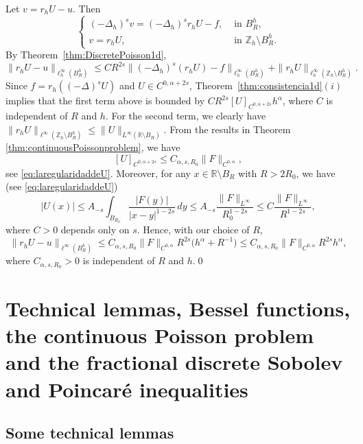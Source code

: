 \documentclass[a4paper,11pt,reqno]{amsart}
\newcommand{\R}{\mathbb{R}}
\newcommand{\Z}{\mathbb{Z}}
\theoremstyle{definition}
\numberwithin{equation}{section}
\begin{document}
Let $v=r_hU-u$. Then
\begin{equation*}
\begin{cases}
(-\Delta_h)^sv=(-\Delta_h)^sr_hU-f, & \text{ in } B_R^h, \\
v=r_hU, & \text{ in } \Z_h\setminus B_R^h.
\end{cases}
\end{equation*}
By Theorem~\ref{thm:DiscretePoisson1d},
\[
\|r_hU-u\|_{\ell_h^\infty(B_R^h)}\le CR^{2s}\|(-\Delta_h)^{s}(r_hU)-f
\|_{\ell^\infty_h(B_R^h)} + \|r_hU\|_{\ell^\infty_h(\Z_h\setminus B_R^h)}.
\]
Since $f=r_h((-\Delta)^sU)$ and $U\in C^{0,\alpha+2s}$,
Theorem~\ref{thm:consistencia1d}$(i)$ implies that the first term above
is bounded by $CR^{2s}[U]_{C^{0,\alpha+2s}}h^{\alpha}$,
where $C$ is independent of $R$ and $h$.
For the second term, we clearly have
$\|r_hU\|_{\ell^\infty(\Z_h\setminus B_R^h)}\le \|U\|_{L^\infty(\R\setminus B_R)}$.
From the results in Theorem \ref{thm:continuousPoissonproblem}, we have
$$
[U]_{C^{0,\alpha+2s}}\leq C_{\alpha,s,R_0}\|F\|_{C^{0,\alpha}},
$$
see \eqref{eq:laregularidaddeU}.
Moreover, for any $x\in \R\setminus B_R$ with $R>2R_0$, we have (see \eqref{eq:laregularidaddeU})
\begin{equation}
\label{laestimaciondeloqueresta}
|U(x)|\le A_{-s}\int_{B_{R_0}}\frac{|F(y)|}{|x-y|^{1-2s}}\,dy
\le A_{-s}\frac{\|F\|_{L^\infty}}{R_0^{1-2s}}\le C\frac{\|F\|_{L^\infty}}{R^{1-2s}},
\end{equation}
where $C>0$ depends only on $s$.
Hence, with our choice of $R$,
\[
\|r_hU-u\|_{\ell^\infty(B_R^h)}
\le C_{\alpha,s,R_0}\|F\|_{C^{0,\alpha}}R^{2s}\big(h^{\alpha}+R^{-1}\big)
\leq C_{\alpha,s,R_0}\|F\|_{C^{0,\alpha}}R^{2s}h^{\alpha},
\]
where $C_{\alpha,s,R_0}>0$ is independent of $R$ and $h$.\qed

\section{Technical lemmas, Bessel functions, the continuous Poisson problem
and the fractional discrete Sobolev and Poincar\'e inequalities}
\label{sec:technical}

\subsection{Some technical lemmas}
\label{subsec:technical-lemmas}
\end{document}
